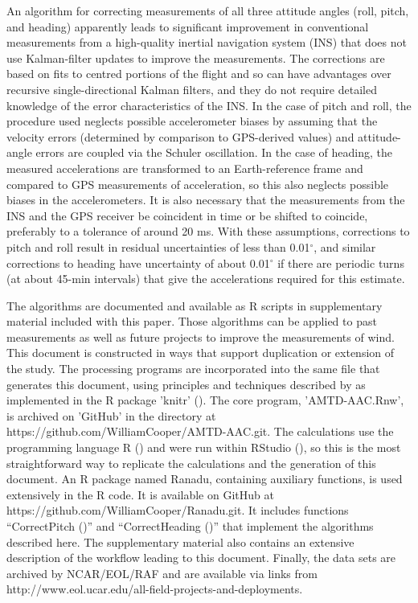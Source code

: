 \documentclass[english,british,amtd,bookmarks=false,unicode=true]{copernicus}\usepackage[]{graphicx}\usepackage[]{color}
\begin{document}

An algorithm for correcting measurements of all three attitude angles
(roll, pitch, and heading) apparently leads to significant improvement
in conventional measurements from a high-quality inertial navigation
system (INS) that does not use Kalman-filter updates to improve the
measurements. The corrections are based on fits to centred portions
of the flight and so can have advantages over recursive single-directional
Kalman filters, and they do not require detailed knowledge of the
error characteristics of the INS. In the case of pitch and roll, the
procedure used neglects possible accelerometer biases by assuming
that the velocity errors (determined by comparison to GPS-derived
values) and attitude-angle errors are coupled via the Schuler oscillation.
In the case of heading, the measured accelerations are transformed
to an Earth-reference frame and compared to GPS measurements of acceleration,
so this also neglects possible biases in the accelerometers. It is
also necessary that the measurements from the INS and the GPS receiver
be coincident in time or be shifted to coincide, preferably to a tolerance
of around 20 ms. With these assumptions, corrections to pitch and
roll result in residual uncertainties of less than 0.01$^{\circ}$,
and similar corrections to heading have uncertainty of about 0.01$^{\circ}$
if there are periodic turns (at about 45-min intervals) that give
the accelerations required for this estimate.

The algorithms are documented and available as R scripts in supplementary
material included with this paper. Those algorithms can be applied
to past measurements as well as future projects to improve the measurements
of wind. This document is constructed in ways that support duplication
or extension of the study. The processing programs are incorporated
into the same file that generates this document, using principles
and techniques described by \citet{Xie2014a} as implemented in the
R package \textquoteright knitr\textquoteright{} (\citet{Xie2014b}).
The core program, \textquoteright AMTD-AAC.Rnw\textquoteright , is
archived on \textquoteright GitHub\textquoteright{} in the directory
at https://github.com/WilliamCooper/AMTD-AAC.git. The calculations
use the programming language R (\citet{Rlanguage}) and were run within
RStudio (\citet{RStudio2012}), so this is the most straightforward
way to replicate the calculations and the generation of this document.
An R package named Ranadu, containing auxiliary functions, is used
extensively in the R code. It is available on GitHub at https://github.com/WilliamCooper/Ranadu.git.
It includes functions ``CorrectPitch ()'' and ``CorrectHeading
()'' that implement the algorithms described here. The supplementary
material also contains an extensive description of the workflow leading
to this document. Finally, the data sets are archived by NCAR/EOL/RAF
and are available via links from http://www.eol.ucar.edu/all-field-projects-and-deployments.
\end{document}
